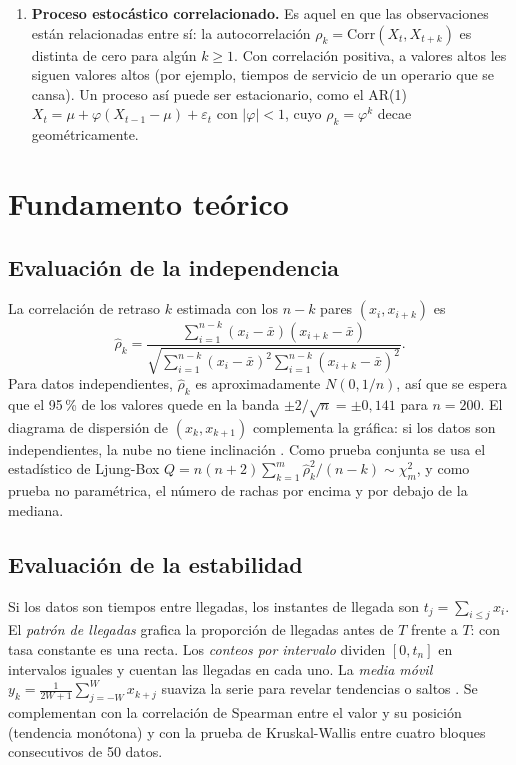 \documentclass[11pt,a4paper]{article}
\begin{document}
\begin{enumerate}[label=\arabic*.]
 la varianza sean constantes y que $\mathrm{Cov}(X_t,X_{t+k})$ dependa solo del retraso $k$.
 Una tendencia en la media, un cambio de varianza o un salto de nivel hacen que el proceso no
 sea estacionario.
 \item \textbf{Proceso estocástico correlacionado.} Es aquel en que las observaciones están
 relacionadas entre sí: la autocorrelación $\rho_k=\mathrm{Corr}(X_t,X_{t+k})$ es distinta de
 cero para algún $k\ge1$. Con correlación positiva, a valores altos les siguen valores altos
 (por ejemplo, tiempos de servicio de un operario que se cansa). Un proceso así puede ser
 estacionario, como el AR(1) $X_t=\mu+\varphi(X_{t-1}-\mu)+\varepsilon_t$ con $|\varphi|<1$, cuyo
 $\rho_k=\varphi^k$ decae geométricamente.
\end{enumerate}

\section{Fundamento teórico}
\subsection{Evaluación de la independencia}
La correlación de retraso $k$ estimada con los $n-k$ pares $(x_i,x_{i+k})$ es
\begin{equation}
 \hat\rho_k=\frac{\sum_{i=1}^{n-k}(x_i-\bar x)(x_{i+k}-\bar x)}{\sqrt{\sum_{i=1}^{n-k}(x_i-\bar x)^2\sum_{i=1}^{n-k}(x_{i+k}-\bar x)^2}}.
\end{equation}
Para datos independientes, $\hat\rho_k$ es aproximadamente $N(0,1/n)$, así que se espera que el
95\,\% de los valores quede en la banda $\pm2/\sqrt n=\pm0{,}141$ para $n=200$. El diagrama de
dispersión de $(x_k,x_{k+1})$ complementa la gráfica: si los datos son independientes, la nube
no tiene inclinación \cite[Sec.~3.4.1]{banks1998}. Como prueba conjunta se usa el estadístico de
Ljung-Box $Q=n(n+2)\sum_{k=1}^{m}\hat\rho_k^2/(n-k)\sim\chi^2_m$, y como prueba no paramétrica, el
número de rachas por encima y por debajo de la mediana.

\subsection{Evaluación de la estabilidad}
Si los datos son tiempos entre llegadas, los instantes de llegada son $t_j=\sum_{i\le j}x_i$. El
\emph{patrón de llegadas} grafica la proporción de llegadas antes de $T$ frente a $T$: con tasa
constante es una recta. Los \emph{conteos por intervalo} dividen $[0,t_n]$ en intervalos
iguales y cuentan las llegadas en cada uno. La \emph{media móvil}
$y_k=\frac{1}{2W+1}\sum_{j=-W}^{W}x_{k+j}$ suaviza la serie para revelar tendencias o saltos
\cite[Sec.~3.4.2]{banks1998}. Se complementan con la correlación de Spearman entre el valor y su
posición (tendencia monótona) y con la prueba de Kruskal-Wallis entre cuatro bloques
consecutivos de 50 datos.
\end{document}
